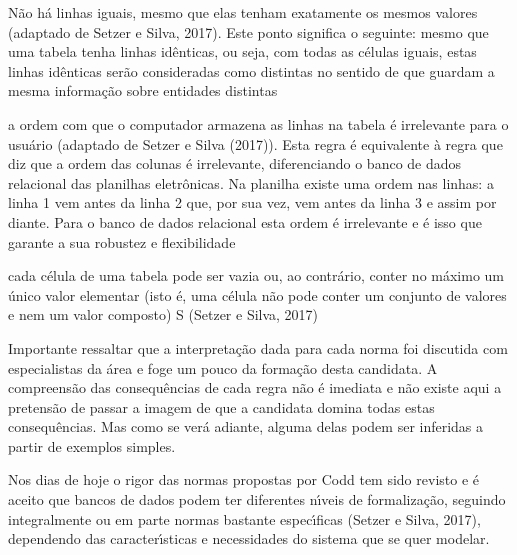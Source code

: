 \documentclass[
12pt,		%
openright,	%
twoside,  %
a4paper,			%
chapter=TITLE,		%
english,			%
french,				%
spanish,			%
brazil				%
]{USPSC-classe/USPSC}
\begin{document}
\begin{alineas}
\item N\~ao h\'a linhas iguais, mesmo que elas tenham exatamente os mesmos valores  (adaptado de Setzer e Silva, 2017). Este ponto significa o seguinte: mesmo que uma tabela tenha linhas id\^enticas, ou seja, com todas as c\'elulas iguais, estas linhas id\^enticas ser\~ao consideradas como distintas no sentido de que guardam a mesma informa\c{c}\~ao sobre entidades distintas
\item a ordem com que o computador armazena as linhas na tabela \'e irrelevante para o usu\'ario  (adaptado de Setzer e Silva (2017)). Esta regra \'e equivalente \`a regra que diz que a ordem das colunas \'e irrelevante, diferenciando o banco de dados relacional das planilhas eletr\^onicas. Na planilha existe uma ordem nas linhas: a linha 1 vem antes da linha 2 que, por sua vez, vem antes da linha 3 e assim por diante. Para o banco de dados relacional esta ordem \'e irrelevante e \'e isso que garante a sua robustez e flexibilidade
\item cada c\'elula de uma tabela pode ser vazia ou, ao contr\'ario, conter no m\'aximo um \'unico valor elementar (isto \'e, uma c\'elula n\~ao pode conter um conjunto de valores e nem um valor composto)  S (Setzer e Silva, 2017)
\end{alineas}

Importante ressaltar que a interpreta\c{c}\~ao dada para cada norma foi discutida com especialistas da \'area e foge um pouco da forma\c{c}\~ao desta candidata. A compreens\~ao das consequ\^encias de cada regra n\~ao \'e imediata e n\~ao existe aqui a pretens\~ao de passar a imagem de que a candidata domina todas estas consequ\^encias. Mas como se ver\'a adiante, alguma delas podem ser inferidas a partir de exemplos simples.

















Nos dias de hoje o rigor das normas propostas por Codd tem sido revisto e \'e aceito que bancos de dados podem ter diferentes n\'{\i}veis de formaliza\c{c}\~ao, seguindo integralmente ou em parte normas bastante espec\'{\i}ficas (Setzer e Silva, 2017), dependendo das caracter\'{\i}sticas e necessidades do sistema que se quer modelar.
\end{document}
